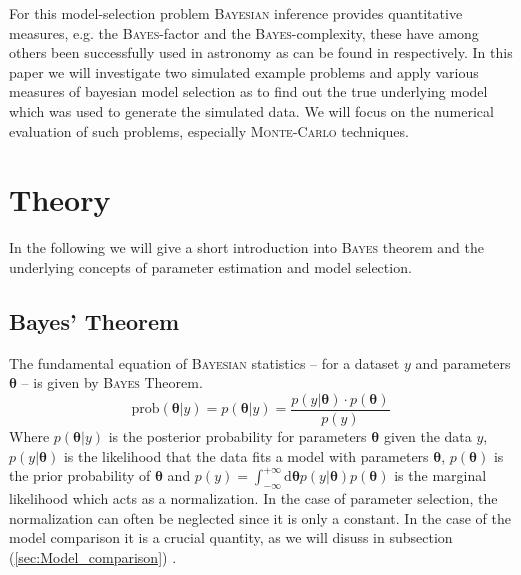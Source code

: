 \documentclass[%
 reprint,
 amsmath,amssymb,
 aps,
]{revtex4-1}
\begin{document}
For this model-selection problem \textsc{Bayesian} inference provides quantitative measures, e.g. the \textsc{Bayes}-factor and the \textsc{Bayes}-complexity, these have among others been successfully used in astronomy as can be found in \cite{trotta,kunz,Trotta_2008} respectively. In this paper we will investigate two simulated example problems and apply various measures of bayesian model selection as to find out the true underlying model which was used to generate the simulated data. We will  focus on the numerical evaluation of such problems, especially\textsc{ Monte-Carlo} techniques.
\section{Theory}
\noindent In the following we will give a short introduction into \textsc{Bayes} theorem and the underlying concepts of parameter estimation and model selection.
\subsection{Bayes' Theorem}
\noindent The fundamental equation of \textsc{Bayesian} statistics -- for a dataset $y$ and parameters $\boldsymbol{\theta}$ -- is given by \textsc{Bayes} Theorem.
\begin{equation}
\label{eq:bayes}
\text{prob}(\boldsymbol{\theta} | y) =	p(\boldsymbol{\theta} | y) = \frac{p(y|\boldsymbol{\theta})\cdot p(\boldsymbol{\theta})}{p(y)} 
\end{equation}
Where $p(\boldsymbol{\theta} | y) $ is the posterior probability for parameters $\boldsymbol{\theta}$ given the data $y$, $p(y|\boldsymbol{\theta})$ is the likelihood that the data fits a model with parameters $\boldsymbol{\theta}$, $p(\boldsymbol{\theta})$ is the prior probability of $\boldsymbol{\theta}$ and $p(y)= \int_{-\infty}^{+\infty}\text{d}\boldsymbol{\theta} p(y|\boldsymbol{\theta})p(\boldsymbol{\theta})$ is the marginal likelihood which acts as a normalization.  In the case of parameter selection, the normalization can often be neglected since it is only a  constant. In the case of the model comparison it is a crucial quantity, as we will disuss in subsection (\ref{sec:Model_comparison}) \cite[Chap. 2]{sivia}. 
\end{document}
